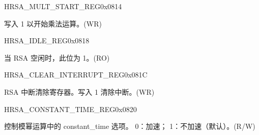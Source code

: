 \begin{register}{H}{RSA\_MULT\_START\_REG}{0x0814}\label{regdesc:RSAMULTSTARTREG}
%
%
\regnewline%
\begin{regdesc}\begin{reglist}
\item [RSA\_MULT\_START] 写入 1 以开始乘法运算。(WR)
\end{reglist}\end{regdesc}
\end{register}



\begin{register}{H}{RSA\_IDLE\_REG}{0x0818}\label{regdesc:RSAIDLEREG}
%
%
\regnewline%
\begin{regdesc}\begin{reglist}
\item [RSA\_IDLE] 当 RSA 空闲时，此位为 1。(RO)
\end{reglist}\end{regdesc}
\end{register}


\begin{register}{H}{RSA\_CLEAR\_INTERRUPT\_REG}{0x081C}\label{regdesc:RSACLEARINTERRUPTREG}
%
%
\regnewline%
\begin{regdesc}\begin{reglist}
\item [RSA\_CLEAR\_INTERRUPT] RSA 中断清除寄存器。写入 1 清除中断。(WR)
\end{reglist}\end{regdesc}
\end{register}


\begin{register}{H}{RSA\_CONSTANT\_TIME\_REG}{0x0820}\label{regdesc:RSACONSTANTTIMEREG}
%
%
\regnewline%
\begin{regdesc}\begin{reglist}
\item [RSA\_CONSTANT\_TIME\_REG] 控制模幂运算中的 constant\_time 选项。
0：加速；
1：不加速（默认）。(R/W)
\end{reglist}\end{regdesc}
\end{register}


